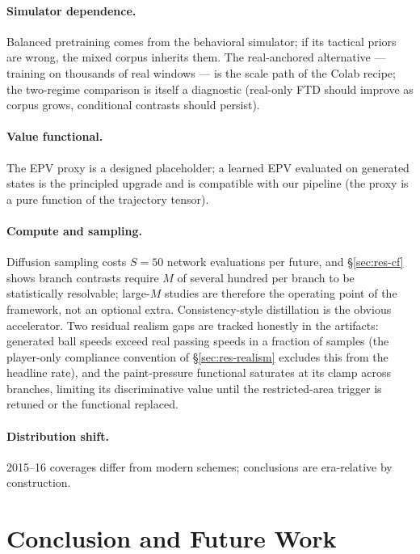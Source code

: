 \documentclass[11pt]{article}
\begin{document}
\paragraph{Simulator dependence.} Balanced pretraining comes from the
behavioral simulator; if its tactical priors are wrong, the mixed corpus
inherits them. The real-anchored alternative --- training on thousands of
real windows --- is the scale path of the Colab recipe; the two-regime
comparison is itself a diagnostic (real-only FTD should improve as corpus
grows, conditional contrasts should persist).

\paragraph{Value functional.} The EPV proxy is a designed placeholder; a
learned EPV \citep{yamamoto2022epv} evaluated on generated states is the
principled upgrade and is compatible with our pipeline (the proxy is a
pure function of the trajectory tensor).

\paragraph{Compute and sampling.} Diffusion sampling costs $S{=}50$ network
evaluations per future, and \S\ref{sec:res-cf} shows branch contrasts require
$M$ of several hundred per branch to be statistically resolvable;
large-$M$ studies are therefore the operating point of the framework, not an
optional extra. Consistency-style distillation is the obvious accelerator.
Two residual realism gaps are tracked honestly in the artifacts: generated
ball speeds exceed real passing speeds in a fraction of samples (the
player-only compliance convention of \S\ref{sec:res-realism} excludes this
from the headline rate), and the paint-pressure functional saturates at its
clamp across branches, limiting its discriminative value until the
restricted-area trigger is retuned or the functional replaced.

\paragraph{Distribution shift.} 2015--16 coverages differ from modern
schemes; conclusions are era-relative by construction.

\section{Conclusion and Future Work}
\label{sec:conclusion}
\end{document}

